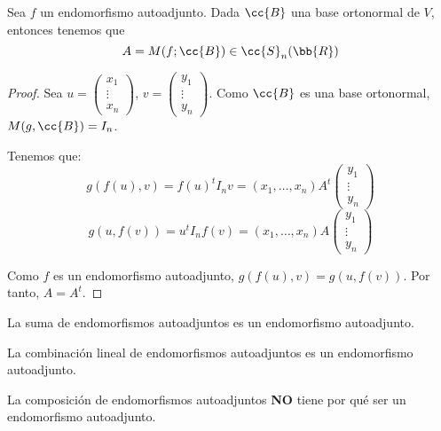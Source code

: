 \begin{prop}
    Sea $f$ un endomorfismo autoadjunto. Dada $\cc{B}$ una base ortonormal de $V$, entonces tenemos que
    $$A = M(f;\cc{B})\in \cc{S}_n(\bb{R})$$
\end{prop}
\begin{proof}
    Sea $u=\left(\begin{array}{c}
         x_1 \\ \vdots \\ x_n
    \end{array}\right)$, $v=\left(\begin{array}{c}
         y_1 \\ \vdots \\ y_n
    \end{array}\right)$. Como $\cc{B}$ es una base ortonormal, $M(g, \cc{B}) = I_n$.

    Tenemos que:
    \begin{equation*}
        g(f(u),v) = f(u)^t I_n v = (x_1, \dots, x_n)A^t \left(\begin{array}{c}
         y_1 \\ \vdots \\ y_n
    \end{array}\right)
    \end{equation*}
    \begin{equation*}
        g(u,f(v)) = u^t I_n f(v) = (x_1, \dots, x_n)A\left(\begin{array}{c}
             y_1 \\ \vdots \\ y_n
        \end{array}\right)
    \end{equation*}

    Como $f$ es un endomorfismo autoadjunto, $g(f(u),v) = g(u,f(v))$. Por tanto, $A=A^t$.
\end{proof}

\begin{lema}
    La suma de endomorfismos autoadjuntos es un endomorfismo autoadjunto.
\end{lema}

\begin{lema}
    La combinación lineal de endomorfismos autoadjuntos es un endomorfismo autoadjunto.
\end{lema}

\begin{observacion}
La composición de endomorfismos autoadjuntos \textbf{NO} tiene por qué ser un endomorfismo autoadjunto.
\end{observacion}

